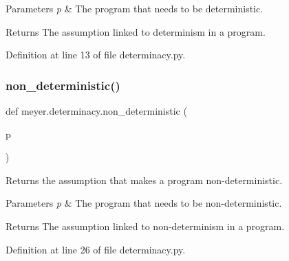 \begin{DoxyParams}{Parameters}
{\em p} & The program that needs to be deterministic. \\
\hline
\end{DoxyParams}
\begin{DoxyReturn}{Returns}
The assumption linked to determinism in a program. 
\end{DoxyReturn}


Definition at line 13 of file determinacy.\+py.

\mbox{\label{namespacemeyer_1_1determinacy_a4013ef0cd782a1778b3f728536039f64}} 
\subsubsection{\texorpdfstring{non\+\_\+deterministic()}{non\_deterministic()}}
{\footnotesize\ttfamily def meyer.\+determinacy.\+non\+\_\+deterministic (\begin{DoxyParamCaption}\item[{}]{p }\end{DoxyParamCaption})}



Returns the assumption that makes a program non-\/deterministic. 


\begin{DoxyParams}{Parameters}
{\em p} & The program that needs to be non-\/deterministic. \\
\hline
\end{DoxyParams}
\begin{DoxyReturn}{Returns}
The assumption linked to non-\/determinism in a program. 
\end{DoxyReturn}


Definition at line 26 of file determinacy.\+py.


